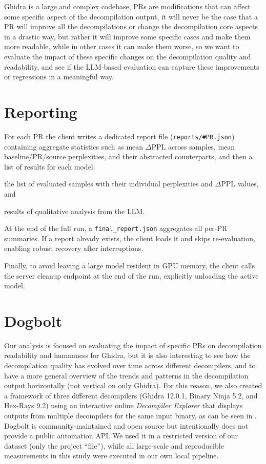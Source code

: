 Ghidra is a large and complex codebase, \acp{PR} are modifications that can affect some specific aspect of the decompilation output, it will never be the case that a \ac{PR} will improve all the decompilations or change the decompilation core aspects in a drastic way, but rather it will improve some specific cases and make them more readable, while in other cases it can make them worse, so we want to evaluate the impact of these specific changes on the decompilation quality and readability, and see if the \ac{LLM}-based evaluation can capture these improvements or regressions in a meaningful way.

\section{Reporting}
For each \ac{PR} the client writes a dedicated report file (\texttt{reports/\#PR.json}) containing aggregate statistics such as mean $\Delta\mathrm{PPL}$ across samples, mean baseline/\ac{PR}/source perplexities, and their abstracted counterparts, and then a list of results for each model:
\begin{inparaenum}[\it (i)]
    \item the list of evaluated samples with their individual perplexities and $\Delta\mathrm{PPL}$ values, and
    \item results of qualitative analysis from the \ac{LLM}.
\end{inparaenum}
At the end of the full run, a \texttt{final\_report.json} aggregates all per-\ac{PR} summaries. If a report already exists, the client loads it and skips re-evaluation, enabling robust recovery after interruptions.

Finally, to avoid leaving a large model resident in \ac{GPU} memory, the client calls the server cleanup endpoint at the end of the run, explicitly unloading the active model.


\section{Dogbolt}\label{sec:dogbolt}
Our analysis is focused on evaluating the impact of specific \acp{PR} on decompilation readability and humanness for Ghidra, but it is also interesting to see how the decompilation quality has evolved over time across different decompilers, and to have a more general overview of the trends and patterns in the decompilation output horizontally (not vertical on only Ghidra).
For this reason, we also created a framework of three different decompilers (Ghidra 12.0.1, Binary Ninja 5.2, and Hex-Rays 9.2) using  an interactive online \emph{Decompiler Explorer} that displays outputs from multiple decompilers for the same input binary, as can be seen in . 
Dogbolt is community-maintained and open source but intentionally does not provide a public automation \ac{API}. We used it in a restricted version of our dataset (only the project ``file''), while all large-scale and reproducible measurements in this study were executed in our own local pipeline.

